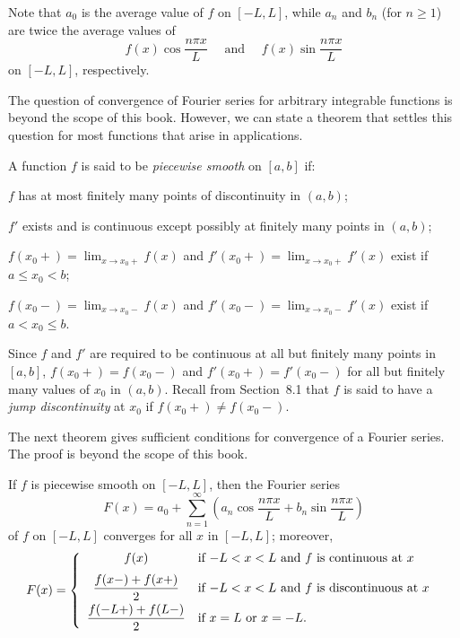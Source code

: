 Note that $a_{0}$ is the average value of $f$ on $[-L,L]$, while $a_{n}$ and $b_{n}$ (for $n\ge1$)
are twice the average values of
\[
  f(x)\cos\frac{n\pi x}{L}\quad\mbox{ and }\quad f(x)\sin\frac{n\pi x}{L}
\]
on $[-L,L]$, respectively.


\noindent
The question of convergence of Fourier series for arbitrary integrable functions is beyond the scope
of this book. However, we can state a theorem that settles this question for most functions that
arise in applications.

\begin{definition}
  \color{blue}
  \label{thmtype:11.2.3}\rm A function $f$ is said to be {\color{blue}\it piecewise smooth\/} on
  $[a,b]$ if:
  \begin{alist}
    \item %
    $f$ has at most finitely many points of discontinuity in $(a,b)$;

    \item %
    $f'$ exists and is continuous except possibly at finitely many points in $(a,b)$;

    \item %
    $f(x_{0}+)=\lim_{x\to x_{0}+}f(x)$ and $f'(x_{0}+)=\lim_{x\to x_{0}+}f'(x)$ exist if
    $a\le x_{0}<b$;

    \item %
    $f(x_{0}-)=\lim_{x\to x_{0}-}f(x)$ and $f'(x_{0}-)=\lim_{x\to x_{0}-}f'(x)$ exist if
    $a<x_{0}\le b$.
  \end{alist}
\end{definition}

Since $f$ and $f'$ are required to be continuous at all but finitely many points in $[a,b]$,
$f(x_{0}+)=f(x_{0}-)$ and $f'(x_{0}+)=f'(x_{0}-)$ for all but finitely many values of $x_{0}$ in
$(a,b)$. Recall from Section~8.1 that $f$ is said to have a {\color{blue}\it jump discontinuity\/}
at $x_{0}$ if $f(x_{0}+)\ne f(x_{0}-)$.

The next theorem gives sufficient conditions for convergence of a Fourier series. The proof is
beyond the scope of this book.

\begin{theorem}
  \color{blue}
  \label{thmtype:11.2.4} If $f$ is piecewise smooth on $[-L,L]$, then the Fourier series
  \begin{equation}
    \label{eq:11.2.8}F(x)=a_{0}+\sum_{n=1}^{\infty}\left(a_{n}\cos\frac{n\pi x}{L}+b_{n}\sin\frac{n\pi x}{L}\right)
  \end{equation}
  of $f$ on $[-L,L]$ converges for all $x$ in $[-L,L]$; moreover,
  \[
    F(x)= \left\{
    \begin{array}{cl}
      f(x)                       & \mbox{if $-L<x<L$ and $f$ is continuous at $x$ }    \\[2\jot]
      \displaystyle\frac{f(x-)+f(x+)}{2}  & \mbox{if $-L<x<L$ and $f$ is discontinuous at $x$ } \\[2\jot]
      \displaystyle\frac{f(-L+)+f(L-)}{2} & \mbox{if $x=L$ or $x=-L$.}
    \end{array}\right.
  \]
\end{theorem}

